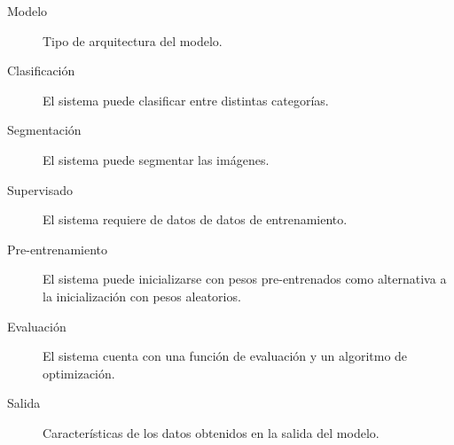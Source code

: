 \begin{description}
    \item[Modelo]{Tipo de arquitectura del modelo.}
    \item[Clasificación]{El sistema puede clasificar entre distintas categorías.}
    \item[Segmentación]{El sistema puede segmentar las imágenes.}
    \item[Supervisado]{ El sistema requiere de datos de datos de entrenamiento.}
    \item[Pre-entrenamiento]{El sistema puede inicializarse con pesos pre-entrenados como alternativa a la inicialización con pesos aleatorios.}
    \item[Evaluación]{El sistema cuenta con una función de evaluación y un algoritmo de optimización.}
    \item[Salida]{Características de los datos obtenidos en la salida del modelo.}
\end{description}
\newpage
